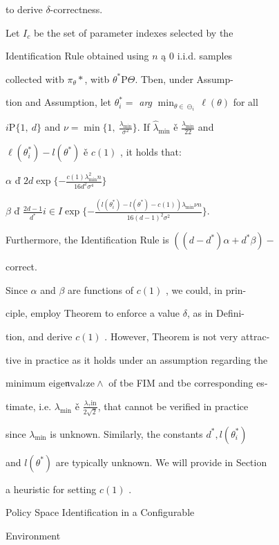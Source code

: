 \documentclass[a4paper,12pt]{article}
\begin{document}
to derive $\delta$-correctness.

Let $I_{c}$ be the set of parameter indexes selected by the

Identification Rule obtained using $n$ ą $0$ i.i.d. samples

collected witb $\pi_{\theta}*$, witb $\theta^{*} \mathrm{P} \Theta$. Tben, under Assump-

tion and Assumption, let $\theta_{i}^{*} =$ {\it arg} $\displaystyle \min_{\theta\in\ominus_{i}}\ell(\theta)$ for all

$i \mathrm{P} \{1,\ d\}$ and $\nu = \displaystyle \min\{1,\ \frac{\lambda_{\min}}{\sigma^{2}}\}$. If $\hat{\lambda}_{\min}$ ě $\displaystyle \frac{\lambda_{\min}}{22}$ and

$\ell(\theta_{i}^{*})-l(\theta^{*})$ ě $c(1)$ , it holds that:

$\alpha$ ď $2d\displaystyle \exp\{-\frac{c(1)\lambda_{\min}^{2}n}{16d^{2}\sigma^{4}}\}$

$\beta$ ď $\displaystyle \frac{2d-1}{d^{*}}i\in I \displaystyle \exp\{-\frac{(l(\theta_{i}^{*})-l(\theta^{*})-c(1))\lambda_{\min}\nu n}{16(d-1)^{2}\sigma^{2}}\}.$

Furthermore, the Identification Rule is $((d-d^{*})\alpha+d^{*}\beta)-$

correct.

Since $\alpha$ and $\beta$ are functions of $c(1)$ , we could, in prin-

ciple, employ Theorem to enforce a value $\delta$, as in Defini-

tion, and derive $c(1)$ . However, Theorem is not very attrac-

tive in practice as it holds under an assumption regarding the

minimum $\mathrm{e}\mathrm{i}\mathrm{g}\mathrm{e}\mathfrak{n}\mathrm{v}\mathrm{a}\mathrm{l}\iota \mathrm{z}\mathrm{e}\wedge$ of tbe FIM and tbe corresponding es-

timate, i.e. $\lambda_{\min}$ ě $\displaystyle \frac{\lambda_{?}\mathrm{i}\mathrm{n}}{2\sqrt{2}}$, that cannot be verified in practice

since $\lambda_{\min}$ is unknown. Similarly, the constants $d^{*}, l(\theta_{i}^{*})$

and $l(\theta^{*})$ are typically unknown. We will provide in Section

a heuristic for setting $c(1)$ .

Policy Space Identification in a Configurable

Environment
\end{document}
